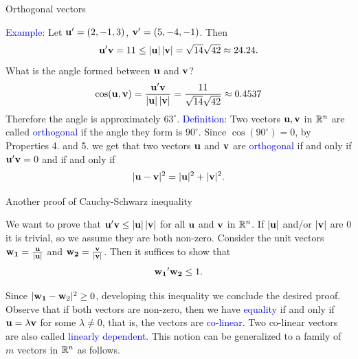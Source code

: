 \documentclass[11pt,aspectratio=169]{beamer}
\begin{document}
\begin{frame}{Orthogonal vectors}

\textcolor{blue}{Example:} Let ${\bf u}'=(2, -1, 3)$, ${\bf v}'=(5,-4,-1)$. Then
$$
{\bf u}' {\bf v}=11\leq \vert {\bf u} \vert \, \vert {\bf v} \vert=\sqrt{14} \sqrt{42} \approx 24.24.
$$
What is the angle formed between $\bf{u}$ and $\bf{v}$?
$$
\cos ({\bf u}, {\bf v})=\frac{{\bf u}' {\bf v}}{\vert {\bf u} \vert \, \vert {\bf v}\vert}=\frac{11}{\sqrt{14} \sqrt{42}} \approx 0.4537
$$
Therefore the angle is approximately $63^{\circ}$.
\vskip 12pt
\textcolor{blue}{Definition:} Two vectors ${\bf u}, {\bf v}$ in $\mathbb R^n$ are called \textcolor{blue}{orthogonal} if
the angle they form is $90^{\circ}$. 
\vskip 12pt
Since $\cos(90^{\circ})=0$, by Properties 4. and 5. we get  that two vectors  ${\bf u}$ and ${\bf v}$ are \textcolor{blue}{orthogonal} if and only if  ${\bf u}' {\bf v}=0$ and if and only if
$$
\vert {\bf u}- {\bf v}\vert^2=\vert {\bf u} \vert^2 +\vert {\bf v}\vert^2.
$$
\end{frame}


\begin{frame}{Another proof of Cauchy-Schwarz inequality}

We want to prove that ${\bf u}' {\bf v} \leq  \vert {\bf  u} \vert \, \vert {\bf v} \vert$ for all $\bf{u}$ and $\bf{v}$ in $\mathbb R^n$.
\vskip 12pt
If $\vert \bf{u} \vert$ and/or $\vert \bf{v} \vert$ are 0 it is trivial, so we assume they are both non-zero.
\vskip 12pt
Consider  the unit vectors $\bf{w_1}=\frac{\bf{u}}{\vert \bf{u} \vert}$ and
$\bf{w_2}=\frac{\bf{v}}{\vert \bf{v} \vert}$. Then it suffices to show that  
$${\bf w_1}' {\bf w_2} \leq  1.$$


Since $\vert {\bf w_1}-{\bf w}_2 \vert^2 \geq 0$, developing this inequality  we  conclude the desired proof.
\vskip 12pt
 Observe that if both vectors are non-zero, then we have \textcolor{blue}{equality}  if and only if $\bf{u}=\lambda \bf{v}$
for some $\lambda \neq 0$, that is, the vectors are  \textcolor{blue}{co-linear}. 
\vskip 12pt
Two co-linear vectors are also called \textcolor{blue}{linearly dependent}. This notion can be  generalized to a family of $m$ vectors in $\mathbb R^n$ as follows.\end{frame}
\end{document}
